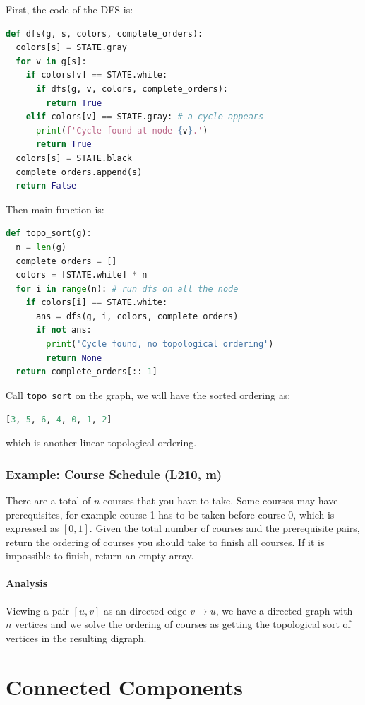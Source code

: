 \documentclass[../main.tex]{subfiles}
\begin{document}
First, the code of the DFS is:
\begin{lstlisting}[language=Python]
def dfs(g, s, colors, complete_orders):
  colors[s] = STATE.gray
  for v in g[s]:
    if colors[v] == STATE.white:
      if dfs(g, v, colors, complete_orders):
        return True
    elif colors[v] == STATE.gray: # a cycle appears
      print(f'Cycle found at node {v}.')
      return True
  colors[s] = STATE.black
  complete_orders.append(s)
  return False
\end{lstlisting}
Then main function is:
\begin{lstlisting}[language=Python]
def topo_sort(g):
  n = len(g)
  complete_orders = []
  colors = [STATE.white] * n
  for i in range(n): # run dfs on all the node
    if colors[i] == STATE.white:
      ans = dfs(g, i, colors, complete_orders)
      if not ans:    
        print('Cycle found, no topological ordering')
        return None 
  return complete_orders[::-1]
\end{lstlisting}
Call \texttt{topo\_sort} on the graph, we will have the sorted ordering as:
\begin{lstlisting}[language=Python]
[3, 5, 6, 4, 0, 1, 2]
\end{lstlisting}
which is another linear topological ordering.
\subsubsection{Example: Course Schedule (L210, m)}
There are a total of $n$ courses that you have to take. Some courses may have prerequisites, for example course 1 has to be taken before course 0, which is expressed as $[0, 1]$. Given the total number of courses and the prerequisite pairs, return the ordering of courses you should take to finish all courses. If it is impossible to finish, return an empty array. 

\paragraph{Analysis} Viewing a pair $[u, v]$ as an directed edge $v\rightarrow u$, we have a directed graph with $n$ vertices and we solve the ordering of courses as getting the topological sort of vertices in the resulting digraph. 

\section{Connected Components}
\label{sec_connected_component}
\end{document}
